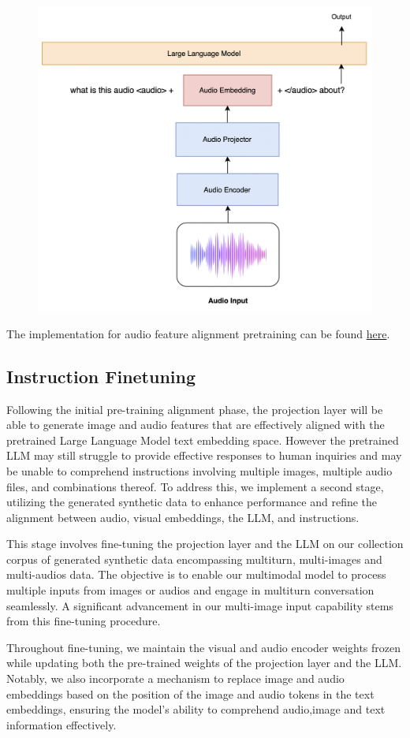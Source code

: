 \documentclass[preprint]{article}
\begin{document}
\begin{figure}[hbt!]
  \centering
  \includegraphics[width=0.6\linewidth]{pic/audio.png} %
\end{figure}

The implementation for audio feature alignment pretraining can be found \href{https://github.com/mesolitica/multimodal-LLM/tree/master/audio-only}{here}.

\subsection{Instruction Finetuning}

Following the initial pre-training alignment phase, the projection layer will be able to generate image and audio features that are effectively aligned with the pretrained Large Language Model text embedding space. However the pretrained LLM may still struggle to provide effective responses to human inquiries and may be unable to comprehend instructions involving multiple images, multiple audio files, and combinations thereof. To address this, we implement a second stage, utilizing the generated synthetic data to enhance performance and refine the alignment between audio, visual embeddings, the LLM, and instructions.

This stage involves fine-tuning the projection layer and the LLM on our collection corpus of generated synthetic data encompassing multiturn, multi-images and multi-audios data. The objective is to enable our multimodal model to process multiple inputs from images or audios and engage in multiturn conversation seamlessly. A significant advancement in our multi-image input capability stems from this fine-tuning procedure.

Throughout fine-tuning, we maintain the visual and audio encoder weights frozen while updating both the pre-trained weights of the projection layer and the LLM. Notably, we also incorporate a mechanism to replace image and audio embeddings based on the position of the image and audio tokens in the text embeddings, ensuring the model's ability to comprehend audio,image and text information effectively.
\end{document}
